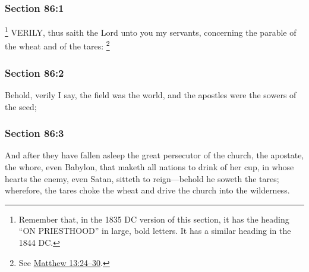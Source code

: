 	\subsubsection{Section 86:1} %
		\label{DC86-1}

			\footnote{%
				Remember that, in the 1835 DC version of this section, it has the heading ``ON PRIESTHOOD'' in large, bold letters. It has a similar heading in the 1844 DC.
				}%
		VERILY, thus saith the Lord unto you my servants, concerning the parable of the wheat and of the tares:%
			\footnote{%
				See \hyperref[MATTHEW-13-24]{Matthew 13:24--30}.
				}


	\subsubsection{Section 86:2} %
		\label{DC86-2}

		Behold, verily I say, the field was the world, and the apostles were the sowers of the seed;


	\subsubsection{Section 86:3} %
		\label{DC86-3}

		And after they have fallen asleep the great persecutor of the church, the apostate, the whore, even Babylon, that maketh all nations to drink of her cup, in whose hearts the enemy, even Satan, sitteth to reign---behold he soweth the tares; wherefore, the tares choke the wheat and drive the church into the wilderness.


